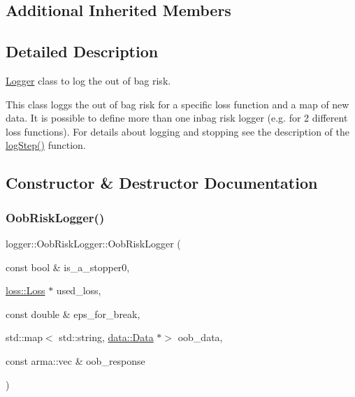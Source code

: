 \subsection*{Additional Inherited Members}


\subsection{Detailed Description}
\mbox{\hyperlink{classlogger_1_1_logger}{Logger}} class to log the out of bag risk. 

This class loggs the out of bag risk for a specific loss function and a map of new data. It is possible to define more than one inbag risk logger (e.\+g. for 2 different loss functions). For details about logging and stopping see the description of the {\ttfamily \mbox{\hyperlink{classlogger_1_1_oob_risk_logger_a948a89f02ac782c25a15c49c4a108c02}{log\+Step()}}} function. 

\subsection{Constructor \& Destructor Documentation}
\mbox{\label{classlogger_1_1_oob_risk_logger_a6c4e307fe35f2c1f329b5cddc1bfe56d}} 
\subsubsection{\texorpdfstring{Oob\+Risk\+Logger()}{OobRiskLogger()}}
{\footnotesize\ttfamily logger\+::\+Oob\+Risk\+Logger\+::\+Oob\+Risk\+Logger (\begin{DoxyParamCaption}\item[{const bool \&}]{is\+\_\+a\+\_\+stopper0,  }\item[{\mbox{\hyperlink{classloss_1_1_loss}{loss\+::\+Loss}} $\ast$}]{used\+\_\+loss,  }\item[{const double \&}]{eps\+\_\+for\+\_\+break,  }\item[{std\+::map$<$ std\+::string, \mbox{\hyperlink{classdata_1_1_data}{data\+::\+Data}} $\ast$$>$}]{oob\+\_\+data,  }\item[{const arma\+::vec \&}]{oob\+\_\+response }\end{DoxyParamCaption})}



